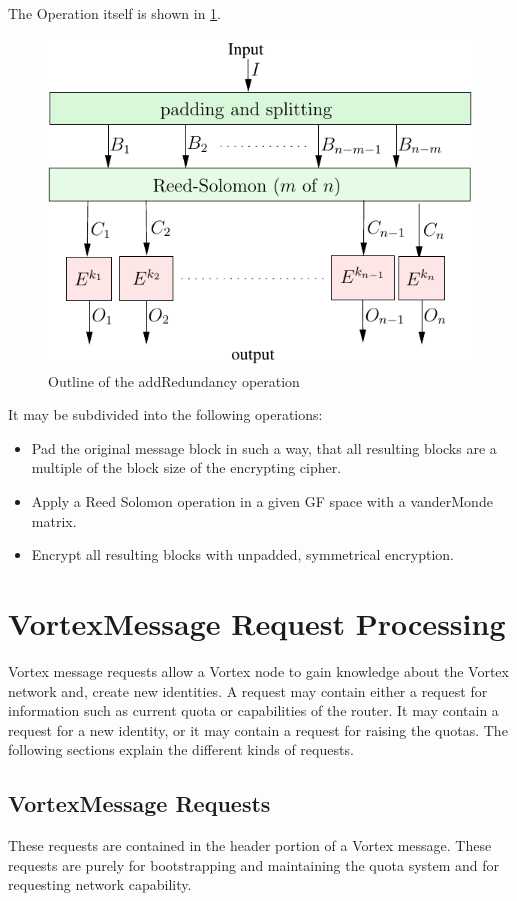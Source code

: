 The Operation itself is shown in \ref{fig:addRedundancyOperation}. 
\begin{figure}[ht]\centering
	\includegraphics[width=0.8\columnwidth]{inc/addRedundancyOp}
	\caption{Outline of the addRedundancy operation}
	\label{fig:addRedundancyOperation}
\end{figure}
It may be subdivided into the following operations:
\begin{itemize}
	\item Pad the original message block in such a way, that all resulting blocks are a multiple of the block size of the encrypting cipher.
	\item Apply a Reed Solomon operation in a given GF space with a vanderMonde matrix.
	\item Encrypt all resulting blocks with unpadded, symmetrical encryption.
\end{itemize}


\section{VortexMessage Request Processing}
Vortex message requests allow a Vortex node to gain knowledge about the Vortex network and, create new identities. A request may contain either a request for information such as current quota or capabilities of the router. It may contain a request for a new identity, or it may contain a request for raising the quotas. The following sections explain the different kinds of requests.

\subsection{VortexMessage Requests}
These requests are contained in the header portion of a Vortex message. These requests are purely for bootstrapping and maintaining the quota system and for requesting network capability.

